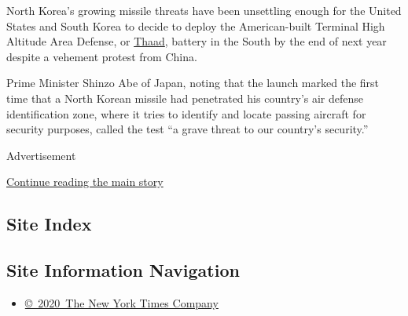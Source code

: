 North Korea's growing missile threats have been unsettling enough for
the United States and South Korea to decide to deploy the American-built
Terminal High Altitude Area Defense, or
\href{http://www.nytimes3xbfgragh.onion/2016/07/08/world/asia/south-korea-and-us-agree-to-deploy-missile-defense-system.html}{Thaad},
battery in the South by the end of next year despite a vehement protest
from China.

Prime Minister Shinzo Abe of Japan, noting that the launch marked the
first time that a North Korean missile had penetrated his country's air
defense identification zone, where it tries to identify and locate
passing aircraft for security purposes, called the test ``a grave threat
to our country's security.''

Advertisement

\protect\hyperlink{after-bottom}{Continue reading the main story}

\hypertarget{site-index}{%
\subsection{Site Index}\label{site-index}}

\hypertarget{site-information-navigation}{%
\subsection{Site Information
Navigation}\label{site-information-navigation}}

\begin{itemize}
\tightlist
\item
  \href{https://help.nytimes3xbfgragh.onion/hc/en-us/articles/115014792127-Copyright-notice}{©~2020~The
  New York Times Company}
\end{itemize}

